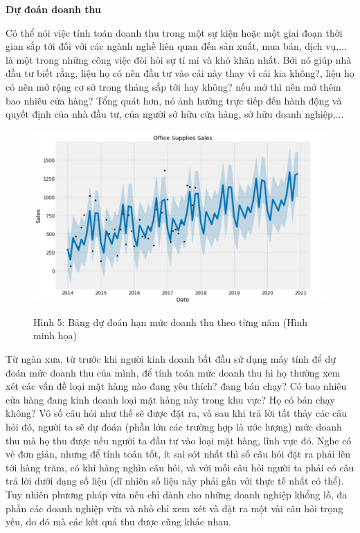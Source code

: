 \vspace{1cm}
\changefontsizes{15pt}
\setlength{\parindent}{0cm}
\textbf{Dự đoán doanh thu}

\vspace{0.5cm}
\changefontsizes{13pt}
\setlength{\parindent}{0cm}

Có thể nói việc tính toán doanh thu trong một sự kiện hoặc một giai đoạn thời gian sắp tới đối với các ngành nghề liên quan đến sản xuất, mua bán, dịch vụ,... là một trong những công việc đòi hỏi sự tỉ mỉ và khó khăn nhất. Bởi nó giúp nhà đầu tư biết rằng, liệu họ có nên đầu tư vào cái này thay vì cái kia không?, liệu họ có nên mở rộng cơ sở trong tháng sắp tới hay không? nếu mở thì nên mở thêm bao nhiêu cửa hàng? Tổng quát hơn, nó ảnh hưởng trực tiếp đến hành động và quyết định của nhà đầu tư, của người sở hữu cửa hàng, sở hữu doanh nghiệp,...


\begin{center}
	\begin{figure}[htp]
		\begin{center}
			\includegraphics[scale=0.4]{./images/sales.png}
		\end{center}
		\label{fig1}{Hình 5: Bảng dự đoán hạn mức doanh thu theo từng năm (Hình minh họa)}
	\end{figure}
\end{center}


Từ ngàn xưa, từ trước khi người kinh doanh bắt đầu sử dụng máy tính để dự đoán mức doanh thu của mình, để tính toán mức doanh thu hì họ thường xem xét các vấn đề loại mặt hàng nào đang yêu thích? đang bán chạy? Có bao nhiêu cửa hàng đang kinh doanh loại mặt hàng này trong khu vực? Họ có bán chạy không? Vô số câu hỏi như thế sẽ được đặt ra, và sau khi trả lời tất thảy các câu hỏi đó, người ta sẽ dự đoán (phần lớn các trường hợp là ước lượng) mức doanh thu mà họ thu được nếu người ta đầu tư vào loại mặt hàng, lĩnh vực đó. Nghe có vẻ đơn giản, nhưng để tính toán tốt, ít sai sót nhất thì số câu hỏi đặt ra phải lên tới hàng trăm, có khi hàng nghìn câu hỏi, và với mỗi câu hỏi người ta phải có câu trả lời dưới dạng số liệu (dĩ nhiên số liệu này phải gần với thực tế nhất có thể). Tuy nhiên phương pháp vừa nêu chỉ dành cho những doanh nghiệp khổng lồ, đa phần các doanh nghiệp vừa và nhỏ chỉ xem xét và đặt ra một vài câu hỏi trọng yếu, do đó mà các kết quả thu được cũng khác nhau.


